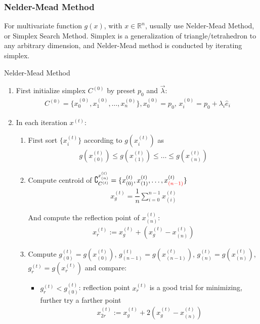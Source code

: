     



\subsubsection{Nelder-Mead Method}
\hypertarget{Simplex}{}
    For multivariate function $ g(x) $, with $ x\in \mathbb{R}^n $, usually use Nelder-Mead Method, or Simplex Search Method. Simplex is a generalization of triangle/tetrahedron to any arbitrary dimension, and Nelder-Mead method is conducted by iterating simplex.



\begin{algorithm}{Nelder-Mead Method}

\begin{enumerate}[topsep=2pt,itemsep=2pt]
    \item First initialize simplex $ C^{(0)} $ by preset $ p_0 $ and $ \vec{\lambda } $:
    \begin{align}
        C^{(0)}=\{x_0^{(0)},x_1^{(0)},\ldots ,x_n^{(0)}\}, x_0^{(0)}=p_0,\,x_i^{(0)}=p_0+\lambda _i\hat{e}_i
    \end{align}
    \item In each iteration $ x^{(t)} $:
    \begin{enumerate}[topsep=2pt,itemsep=2pt]
        \item First sort $ \{x_i^{(t)}\} $ according to $ g(x_i^{(t)}) $ as
    \begin{align}
        g(x_{(0)}^{(t)})\leq g(x_{(1)}^{(t)})\leq\ldots\leq g(x_{(n)}^{(t)})
    \end{align}
    \item Compute centroid of  $ \complement_{C^{(t)}}^{x_{(n)}^{(t)}}=\{x_{(0)}^{(t)},x_{(1)}^{(t)},\ldots,x^{(t)}_{\color{red}(n-1)}\} $
    \begin{align}
        x_g^{(t)}= \dfrac{1}{n}\sum_{i=0}^{n-1}x_{(i)}^{(t)}
    \end{align}
    
    And compute the reflection point of $ x_{(n)}^{(t)} $:
    \begin{align}
        x_r^{(t)}:=x_g^{(t)}+(x_g^{(t)}-x_{(n)}^{(t)})
    \end{align}
    
    \item Compute $ g_{(0)}^{(t)}=g(x_{(0)}^{(t)}) $, $g_{(n-1)}^{(t)}= g(x_{(n-1)}^{(t)}) $, $ g_{(n)}^{(t)}=g(x_{(n)}^{(t)}) $, $ g_{r}^{(t)}=g(x_{r}^{(t)}) $ and compare:
    \begin{itemize}[topsep=2pt,itemsep=0pt]
        \item $ g_{r}^{(t)}<g_{(0)}^{(t)} $: reflection point $ x_r^{(t)} $ is a good trial for minimizing, further try a farther point
        \begin{align}
            x_{2r}^{(t)}:= x_g^{(t)}+2(x_g^{(t)}-x_{(n)}^{(t)})
        \end{align}
    

\end{itemize}
\end{enumerate}
\end{enumerate}
\end{algorithm}
